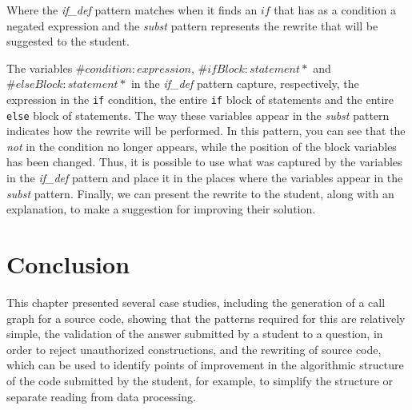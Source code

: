 Where the \textit{if\_def} pattern matches when it finds an \(if\) that has as
a condition a negated expression and the \textit{subst} pattern represents the
rewrite that will be suggested to the student.

The variables \(\#condition:expression\), \(\#ifBlock:statement*\) and \(\#elseBlock:statement*\)
in the \textit{if\_def} pattern capture, respectively, the expression in the
\texttt{if} condition, the entire \texttt{if} block of statements and the entire
\texttt{else} block of statements.
The way these variables appear in the \textit{subst} pattern indicates how the
rewrite will be performed. In this pattern, you can see that the \textit{not}
in the condition no longer appears, while the position of the block variables
has been changed. Thus, it is possible to use what was captured by the variables
in the \textit{if\_def} pattern and place it in the places where the variables
appear in the \textit{subst} pattern.
Finally, we can present the rewrite to the student, along with an explanation, to
make a suggestion for improving their solution.

\section{Conclusion}\label{sec:results-conclusion}

This chapter presented several case studies, including the generation of a call 
graph for a source code, showing that the patterns required for this are relatively 
simple, the validation of the answer submitted by a student to a question, in 
order to reject unauthorized constructions, and the rewriting of source code, 
which can be used to identify points of improvement in the algorithmic structure 
of the code submitted by the student, for example, to simplify the structure or 
separate reading from data processing.

\cleardoublepage
